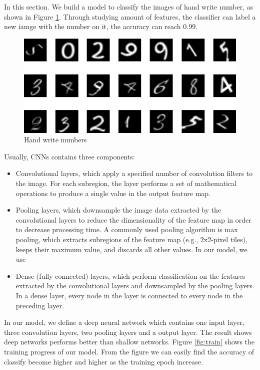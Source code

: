In this section. We build a model to classify the images of hand write number, as shown in Figure \ref{fig:number}. Through studying amount of features, the classifier can label a new iamge with the number on it, the accuracy can reach 0.99.

\begin{figure}[h!]
	\centering
	\includegraphics[width=0.8\linewidth]{figures/part3/number}
	\caption{Hand write numbers}
	\label{fig:number}
\end{figure} 

Usually, CNNs contains three components:
\begin{itemize}
	\item Convolutional layers, which apply a specified number of convolution filters to the image. For each subregion, the layer performs a set of mathematical operations to produce a single value in the output feature map.
	\item Pooling layers, which downsample the image data extracted by the convolutional layers to reduce the dimensionality of the feature map in order to decrease processing time. A commonly used pooling algorithm is max pooling, which extracts subregions of the feature map (e.g., 2x2-pixel tiles), keeps their maximum value, and discards all other values. In our model, we use 
	\item Dense (fully connected) layers, which perform classification on the features extracted by the convolutional layers and downsampled by the pooling layers. In a dense layer, every node in the layer is connected to every node in the preceding layer.
\end{itemize}

In our model, we define a deep neural network which contains one input layer, three convolution layers, two pooling layers and a output layer. The result shows deep networks performs better than shallow networks. Figure \ref{fig:train} shows the training progress of our model. From the figure we can easily find the accuracy of classify become higher and higher as the training epoch increase. 

